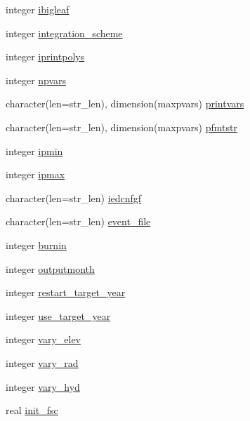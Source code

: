 \begin{DoxyCompactItemize}
\item 
integer \hyperlink{namespaceed__misc__coms_a1ae8a451acc598f43489c44b8eb16d4d}{ibigleaf}
\item 
integer \hyperlink{namespaceed__misc__coms_ab8951beb1912e4b3c3fc4be49b315cf1}{integration\+\_\+scheme}
\item 
integer \hyperlink{namespaceed__misc__coms_af706beac09d172fc210941e0f536ec8f}{iprintpolys}
\item 
integer \hyperlink{namespaceed__misc__coms_a6dcd08f6c29a21f22660d1dcb7897ab7}{npvars}
\item 
character(len=str\+\_\+len), dimension(maxpvars) \hyperlink{namespaceed__misc__coms_abeda9131f5dae12b63b8d2521319f87d}{printvars}
\item 
character(len=str\+\_\+len), dimension(maxpvars) \hyperlink{namespaceed__misc__coms_aed54f9188bbb97c53b47547c92b42e8c}{pfmtstr}
\item 
integer \hyperlink{namespaceed__misc__coms_a36b003939acbea3d21a3c5bcba10e01d}{ipmin}
\item 
integer \hyperlink{namespaceed__misc__coms_af80ae2bbe024585e70d98c52bc5036bd}{ipmax}
\item 
character(len=str\+\_\+len) \hyperlink{namespaceed__misc__coms_af3a616393e9f54c5d4f173675475e3bf}{iedcnfgf}
\item 
character(len=str\+\_\+len) \hyperlink{namespaceed__misc__coms_ab72c19aca546884ef6b4a1b38aa52500}{event\+\_\+file}
\item 
integer \hyperlink{namespaceed__misc__coms_a9b554bb456be251df521579a073ec34d}{burnin}
\item 
integer \hyperlink{namespaceed__misc__coms_a748c85614a28e87c39dc53fa6ab1b9a0}{outputmonth}
\item 
integer \hyperlink{namespaceed__misc__coms_ad370e6ac01b25fa7a3e25026a738f75a}{restart\+\_\+target\+\_\+year}
\item 
integer \hyperlink{namespaceed__misc__coms_ae4a76d724faf120b2006204ff0ef23c1}{use\+\_\+target\+\_\+year}
\item 
integer \hyperlink{namespaceed__misc__coms_ab21ac81aaca643770273c9cd7459fdf4}{vary\+\_\+elev}
\item 
integer \hyperlink{namespaceed__misc__coms_a27e42c090b331a3e77fe6dc919f92ef9}{vary\+\_\+rad}
\item 
integer \hyperlink{namespaceed__misc__coms_aeaa438f9adddfed7efc7723a54a0c4c1}{vary\+\_\+hyd}
\item 
real \hyperlink{namespaceed__misc__coms_a33e58e5288ad2fa889ed0de0fcdef094}{init\+\_\+fsc}

\end{DoxyCompactItemize}
